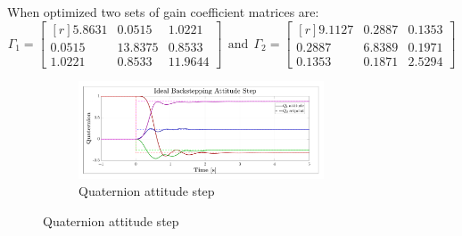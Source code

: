 When optimized two sets of gain coefficient matrices are:
\begin{equation}\label{eq:optimized-IBC}
\Gamma_1 = \begin{bmatrix*}[r]
5.8631 & 0.0515 & 1.0221\\
0.0515 & 13.8375 & 0.8533\\
1.0221 & 0.8533 & 11.9644
\end{bmatrix*}
~~\text{and}~~
\Gamma_2 = \begin{bmatrix*}[r]
9.1127 & 0.2887 & 0.1353\\
0.2887 & 6.8389 & 0.1971\\
0.1353 & 0.1871 & 2.5294
\end{bmatrix*}
\end{equation}
\begin{figure}[hbtp]
\vspace{-20pt}
\centering
\begin{subfigure}{\textwidth}
\centering
\includegraphics[width=0.8\textwidth]{graphs/IBC_Step}
\vspace{-10pt}
\caption{Quaternion attitude step}
\label{fig:IBC_Step}
\end{subfigure}
\vspace{-20pt}
\end{figure}
\newpage
